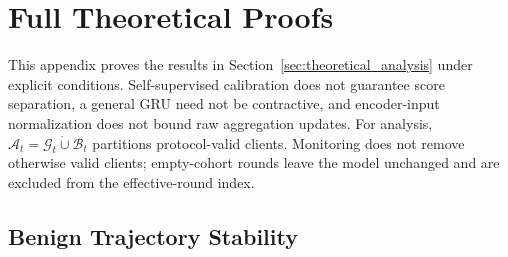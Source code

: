 \section{Full Theoretical Proofs}
\label{app:full_theoretical_proofs}

This appendix proves the results in Section~\ref{sec:theoretical_analysis} under explicit conditions. Self-supervised calibration does not guarantee score separation, a general GRU need not be contractive, and encoder-input normalization does not bound raw aggregation updates. For analysis, $\mathcal{A}_t=\mathcal{G}_t\mathbin{\dot\cup}\mathcal{B}_t$ partitions protocol-valid clients. Monitoring does not remove otherwise valid clients; empty-cohort rounds leave the model unchanged and are excluded from the effective-round index.

\subsection{Benign Trajectory Stability}
\label{app:proof_benign_stability}

